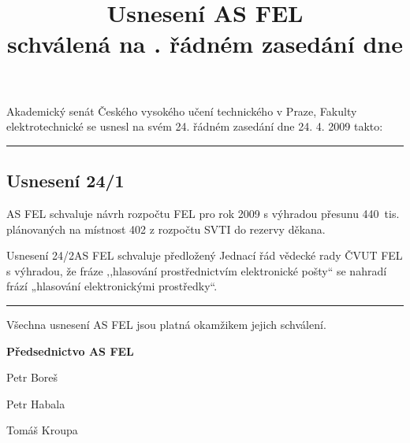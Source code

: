 \documentclass[a4paper,12pt,notitlepage]{article}
\title{Usnesení AS FEL\\schválená na \cislo. řádném zasedání dne \datum}
\author{}\date{}
\newcommand{\cislo}{24}
\newcommand{\datum}{24. 4. 2009 }
\newcommand{\hr}{\bigskip\hrule\bigskip}
\newcommand{\usneseni}[3]{
\subsection*{#1}

#2

}
\begin{document}
\maketitle
\thispagestyle{empty}


Akademický senát Českého vysokého učení technického v Praze, Fakulty
elektrotechnické se usnesl na svém \cislo. řádném zasedání dne \datum takto:\hr

\usneseni{Usnesení \cislo/1}{AS FEL schvaluje návrh rozpočtu FEL pro rok 2009 s výhradou přesunu 440~tis. plánovaných na místnost 402 z rozpočtu SVTI do rezervy děkana.}

\usneseni{Usnesení \cislo/2}{AS FEL schvaluje předložený Jednací řád vědecké rady ČVUT FEL s výhradou, že fráze ‚,hlasování prostřednictvím elektronické pošty“ se nahradí frází „hlasování elektronickými prostředky“.}




\bigskip\hr
Všechna usnesení AS FEL jsou platná okamžikem jejich schválení.

\bigskip
\begin{center}
\textbf{Předsednictvo AS FEL}

Petr Boreš

Petr Habala

Tomáš Kroupa
\end{center}
\end{document}

